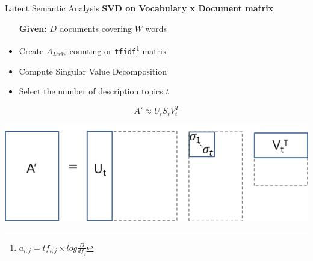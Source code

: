 \documentclass[10pt]{beamer}
\begin{document}
\begin{frame}{Latent Semantic Analysis}
  {\bf SVD on Vocabulary x Document matrix}

  \begin{itemize}
  \item[{\bf Given:}] $D$ documents covering $W$ words
  \item Create $A_{DxW}$ counting or \texttt{tfidf}\footnote{
    {$a_{i,j} = tf_{i,j} \times log \frac{D}{df_j}$}
  } matrix
  \item Compute Singular Value Decomposition
  \item Select the number of description topics $t$
  \end{itemize}

  \begin{multicols}{2}
    \[A' \approx U_t S_t V_t^T\]
    \columnbreak

    \includegraphics[width=\columnwidth]{svd.png}
  \end{multicols}
\end{frame}
\end{document}
